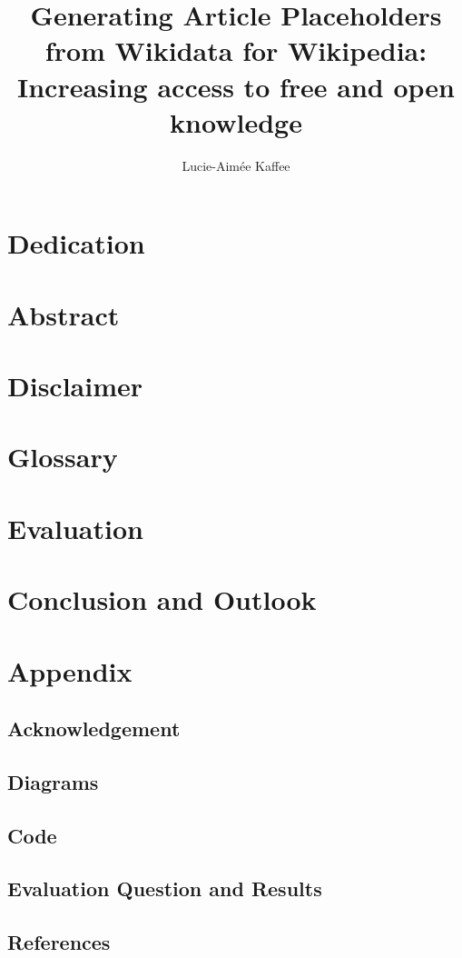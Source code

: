 \documentclass[11pt]{article}
\title{Generating Article Placeholders from Wikidata for Wikipedia:\\Increasing access to free and open knowledge}
\author{Lucie-Aim\'{e}e Kaffee}
\date{}
\begin{document}
\linenumbers
\maketitle
\newpage

\section*{Dedication}
\section*{Abstract}
\section*{Disclaimer}
\section*{Glossary}
\newpage

\tableofcontents




\newpage

\newpage

\section{Evaluation}
\section{Conclusion and Outlook}
\section{Appendix}
	\subsection{Acknowledgement}
	\subsection{Diagrams}
	\subsection{Code}
	\subsection{Evaluation Question and Results}
	\subsection{References}
\end{document}
